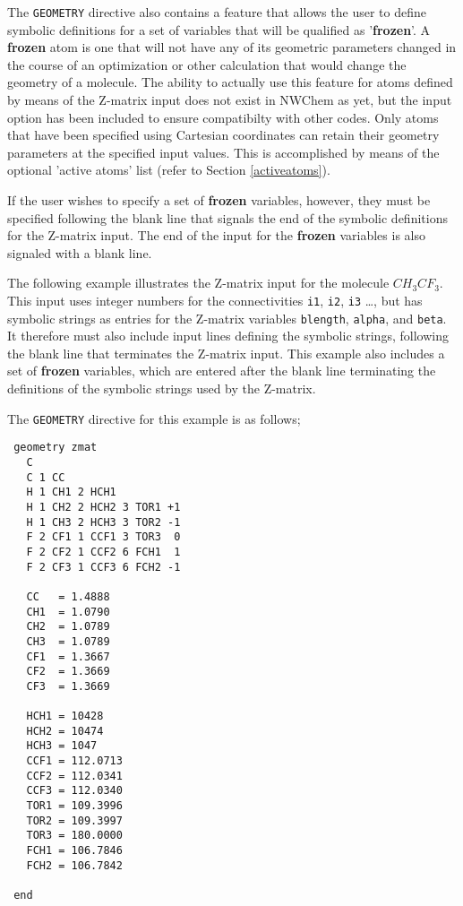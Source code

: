The \verb+GEOMETRY+ directive also contains a feature that allows the user
to define symbolic definitions for a set of variables that will be 
qualified as '{\bf frozen}'.  A {\bf frozen} atom is one that will not
have any of its geometric parameters changed in the course of an optimization
or other calculation that would change the geometry of a molecule.  
The ability to actually use this feature
for atoms defined by means of the Z-matrix input does not exist in NWChem
as yet, but the input option has been included to ensure compatibilty with
other codes.  Only atoms that have been specified using Cartesian coordinates
can retain their geometry parameters at the specified input values.  This
is accomplished by means of the optional 'active atoms' list (refer to Section
\ref{activeatoms}).

If the user wishes to specify a set of {\bf frozen} variables, however,
they must be specified following the blank line that signals the end of 
the symbolic definitions for the Z-matrix input.  The end of the input
for the {\bf frozen} variables is also signaled with a blank line.

The following example illustrates the Z-matrix input for the molecule
$CH_3CF_3$.  This input uses integer numbers for the connectivities {\tt i1},
{\tt i2}, {\tt i3} \ldots, but has symbolic strings as entries for the Z-matrix
variables {\tt blength}, {\tt alpha}, and {\tt beta}.  It therefore must
also include input lines defining the symbolic strings, following the blank
line that terminates the Z-matrix input.  This example also includes a set
of {\bf frozen} variables, which are entered after the blank line terminating
the definitions of the symbolic strings used by the Z-matrix.




The \verb+GEOMETRY+ directive for this example is as follows;

\begin{verbatim}
 geometry zmat
   C 
   C 1 CC 
   H 1 CH1 2 HCH1 
   H 1 CH2 2 HCH2 3 TOR1 +1 
   H 1 CH3 2 HCH3 3 TOR2 -1 
   F 2 CF1 1 CCF1 3 TOR3  0 
   F 2 CF2 1 CCF2 6 FCH1  1 
   F 2 CF3 1 CCF3 6 FCH2 -1

   CC   = 1.4888 
   CH1  = 1.0790 
   CH2  = 1.0789  
   CH3  = 1.0789  
   CF1  = 1.3667 
   CF2  = 1.3669 
   CF3  = 1.3669

   HCH1 = 10428 
   HCH2 = 10474 
   HCH3 = 1047 
   CCF1 = 112.0713 
   CCF2 = 112.0341 
   CCF3 = 112.0340 
   TOR1 = 109.3996 
   TOR2 = 109.3997 
   TOR3 = 180.0000 
   FCH1 = 106.7846 
   FCH2 = 106.7842

 end   
\end{verbatim}

